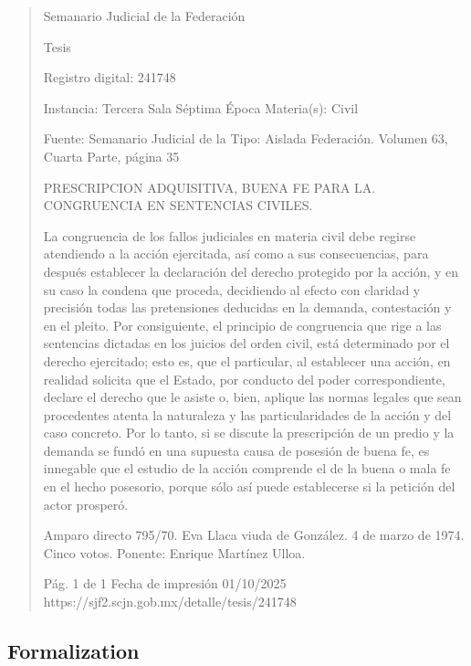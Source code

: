 \documentclass[11pt,a4paper]{article}
\begin{document}
\begin{quote}
                                                   Semanario Judicial de la Federación

                                                  Tesis

 Registro digital: 241748

 Instancia: Tercera Sala           Séptima Época                          Materia(s): Civil

                                   Fuente: Semanario Judicial de la       Tipo: Aislada
                                   Federación.
                                   Volumen 63, Cuarta Parte, página
                                   35


PRESCRIPCION ADQUISITIVA, BUENA FE PARA LA. CONGRUENCIA EN SENTENCIAS
CIVILES.


La congruencia de los fallos judiciales en materia civil debe regirse atendiendo a la acción
ejercitada, así como a sus consecuencias, para después establecer la declaración del derecho
protegido por la acción, y en su caso la condena que proceda, decidiendo al efecto con claridad y
precisión todas las pretensiones deducidas en la demanda, contestación y en el pleito. Por
consiguiente, el principio de congruencia que rige a las sentencias dictadas en los juicios del orden
civil, está determinado por el derecho ejercitado; esto es, que el particular, al establecer una acción,
en realidad solicita que el Estado, por conducto del poder correspondiente, declare el derecho que
le asiste o, bien, aplique las normas legales que sean procedentes atenta la naturaleza y las
particularidades de la acción y del caso concreto. Por lo tanto, si se discute la prescripción de un
predio y la demanda se fundó en una supuesta causa de posesión de buena fe, es innegable que el
estudio de la acción comprende el de la buena o mala fe en el hecho posesorio, porque sólo así
puede establecerse si la petición del actor prosperó.


Amparo directo 795/70. Eva Llaca viuda de González. 4 de marzo de 1974. Cinco votos. Ponente:
Enrique Martínez Ulloa.




                                              Pág. 1 de 1             Fecha de impresión 01/10/2025
  https://sjf2.scjn.gob.mx/detalle/tesis/241748

\end{quote}

\subsection{Formalization}
\end{document}
